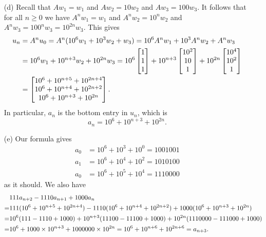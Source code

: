 \documentclass[a4paper]{amsart}
\renewenvironment{solution}{\SolutionInline}{\endSolutionInline}
\begin{document}
\begin{solution}
\begin{itemize}
  \item[(d)] Recall that $Aw_1=w_1$ and $Aw_2=10w_2$ and
   $Aw_3=100w_3$.  It follows that for all $n\geq 0$ we have
   $A^nw_1=w_1$ and $A^nw_2=10^nw_2$ and
   $A^nw_3=100^nw_3=10^{2n}w_3$.  This gives
   \begin{align*}
    u_n &= A^nu_0 
         = A^n(10^6 w_1 + 10^3 w_2 + w_3) 
         = 10^6 A^nw_1 + 10^3 A^nw_2 + A^nw_3 \\
        &= 10^6w_1 + 10^{n+3}w_2 + 10^{2n}w_3 
         = 10^6     \left[\begin{matrix} 1    \\ 1    \\ 1 \end{matrix}\right] + 
           10^{n+3} \left[\begin{matrix} 10^2 \\ 10   \\ 1 \end{matrix}\right] + 
           10^{2n}  \left[\begin{matrix} 10^4 \\ 10^2 \\ 1 \end{matrix}\right] \\
        &= \left[\begin{matrix} 10^6 + 10^{n+5} + 10^{2n+4} \\
                10^6 + 10^{n+4} + 10^{2n+2} \\
                10^6 + 10^{n+3} + 10^{2n} \end{matrix}\right].
   \end{align*}
   In particular, $a_n$ is the bottom entry in $u_n$, which is
   \[ a_n = 10^6 + 10^{n+3} + 10^{2n}. \]
  \item[(e)] Our formula gives
   \begin{align*}
    a_0 &= 10^6 + 10^{3} + 10^{0} = 1001001 \\
    a_1 &= 10^6 + 10^{4} + 10^{2} = 1010100 \\
    a_0 &= 10^6 + 10^{5} + 10^{4} = 1110000 
   \end{align*}
   as it should.  We also have
   \begin{align*}
      & 111a_{n+2}-1110 a_{n+1}+1000a_n \\
     =& 111(10^6 + 10^{n+5} + 10^{2n+4}) - 
        1110(10^6 + 10^{n+4} + 10^{2n+2}) +
        1000(10^6 + 10^{n+3} + 10^{2n}) \\
     =& 10^6(111-1110+1000) + 
        10^{n+3}(11100-11100+1000) +
        10^{2n}(1110000-111000+1000) \\
     =& 10^6 + 1000\times 10^{n+3} + 1000000\times 10^{2n} 
     =  10^6 + 10^{n+6} + 10^{2n+6} = a_{n+3}.
   \end{align*}
 \end{itemize}
\end{solution}
\end{document}
